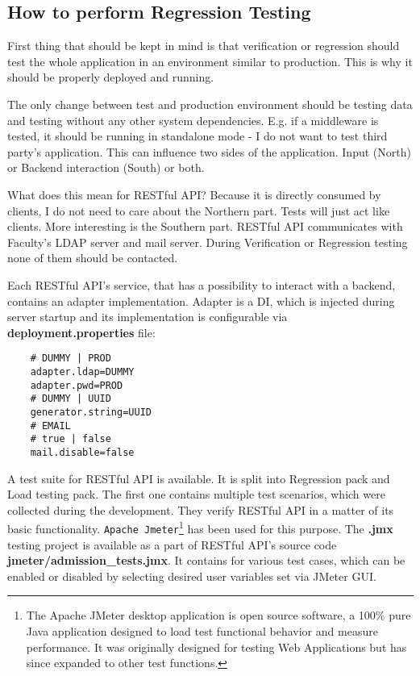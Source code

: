 	\subsection{How to perform Regression Testing}
	
	First thing that should be kept in mind is that verification or regression should test the whole application in an
	environment similar to production. This is why it should be properly deployed and running.
	
	The only change between test and production environment should be testing data and testing without any other system
	dependencies. E.g. if a middleware is tested, it should be running in standalone mode - I do not want to test third
	party's application. This can influence two sides of the application. Input (North) or Backend interaction (South) or
	both.
	
	What does this mean for RESTful API? Because it is directly consumed by clients, I do not need to care about the
	Northern part. Tests will just act like clients. More interesting is the Southern part. RESTful API communicates with
	Faculty's LDAP server and mail server. During Verification or Regression testing none of them should be contacted.
	
	Each RESTful API's service, that has a possibility to interact with a backend, contains an adapter implementation.
	Adapter is a \gls{DI}, which is injected during server startup and its implementation is configurable via
	\textbf{deployment.properties} file:
	
	\begin{verbatim}
	# DUMMY | PROD
	adapter.ldap=DUMMY
	adapter.pwd=PROD
	# DUMMY | UUID
	generator.string=UUID
	# EMAIL
	# true | false
	mail.disable=false
	\end{verbatim}
	
	A test suite for RESTful API is available. It is split into Regression pack and Load testing pack. The first one
	contains multiple test scenarios, which were collected during the development. They verify RESTful API in a matter of
	its basic functionality. \verb|Apache Jmeter|\footnote{\cite{jmeter} The Apache JMeter\textsuperscript{\texttrademark}
	desktop application is open source software, a 100\% pure Java application designed to load test functional behavior and measure performance. It was originally designed for testing Web Applications but has since expanded to other test functions.} has been used for
	this purpose. The \textbf{.jmx} testing project is available as a part of RESTful API's source code
	\textbf{jmeter/admission\_tests.jmx}. It contains  for various test cases, which can be enabled or
	disabled by selecting desired user variables set via JMeter GUI.
	
